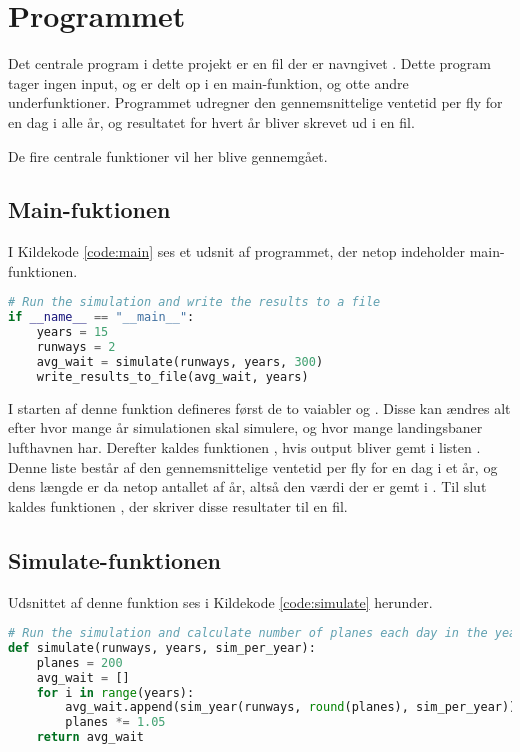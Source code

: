 \chapter{Programmet} \label{chap:program}
Det centrale program i dette projekt er en fil der er navngivet .
Dette program tager ingen input, og er delt op i en main-funktion, og otte andre underfunktioner.
Programmet udregner den gennemsnittelige ventetid per fly for en dag i alle år, og resultatet for hvert år bliver skrevet ud i en fil.

De fire centrale funktioner vil her blive gennemgået.

\section{Main-fuktionen}
I Kildekode \ref{code:main} ses et udsnit af programmet, der netop indeholder main-funktionen.

\begin{lstlisting}[language=Python, caption={Main-funktionen i airplanes.py}, label=code:main]
# Run the simulation and write the results to a file
if __name__ == "__main__":
    years = 15
    runways = 2
    avg_wait = simulate(runways, years, 300)
    write_results_to_file(avg_wait, years)
\end{lstlisting}

I starten af denne funktion defineres først de to vaiabler  og . Disse kan ændres alt efter hvor mange år simulationen skal simulere, og hvor mange landingsbaner lufthavnen har.
Derefter kaldes funktionen , hvis output bliver gemt i listen .
Denne liste består af den gennemsnittelige ventetid per fly for en dag i et år, og dens længde er da netop antallet af år, altså den værdi der er gemt i .
Til slut kaldes funktionen , der skriver disse resultater til en fil.

\section{Simulate-funktionen}
Udsnittet af denne funktion ses i Kildekode \ref{code:simulate} herunder.

\begin{lstlisting}[language=Python, caption={simulate-funktionen i airplanes.py}, label=code:simulate]
# Run the simulation and calculate number of planes each day in the year
def simulate(runways, years, sim_per_year):
    planes = 200
    avg_wait = []
    for i in range(years):
        avg_wait.append(sim_year(runways, round(planes), sim_per_year))
        planes *= 1.05
    return avg_wait
\end{lstlisting}

